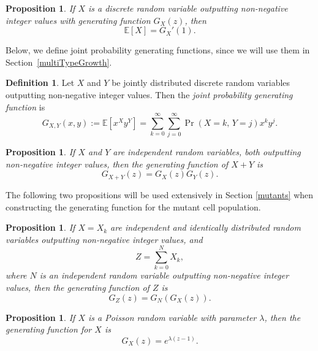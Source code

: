 \documentclass[12pt]{amsart}
\theoremstyle{plain}
\newtheorem{prop}[thm]{Proposition}
\theoremstyle{definition}
\newtheorem{defn}[thm]{Definition}
\theoremstyle{remark}
\theoremstyle{definition}
\begin{document}
\begin{prop}
If $X$ is a discrete random variable outputting non-negative integer values with generating function $G_X(z)$, then
\begin{equation}
\mathbb{E}[X] = G_X'(1).
\end{equation}
\end{prop}

Below, we define joint probability generating functions, since we will use them in Section~\ref{multiTypeGrowth}.

\begin{defn}
Let $X$ and $Y$ be jointly distributed discrete random variables outputting non-negative integer values. Then the \emph{joint probability generating function} is
\begin{equation}
G_{X,Y}(x,y) := \mathbb{E}\left[ x^X y^Y \right] = \sum_{k=0}^\infty \sum_{j=0}^\infty \Pr(X=k, \, Y=j) x^k y^j.
\end{equation}
\end{defn}

\begin{prop}
If $X$ and $Y$ are independent random variables, both outputting non-negative integer values, then the generating function of $X+Y$ is
\begin{equation}
G_{X+Y}(z) = G_X(z) G_Y(z).
\end{equation}
\end{prop}

The following two propositions will be used extensively in Section \ref{mutants} when constructing the generating function for the mutant cell population.

\begin{prop}
If $X=X_k$ are independent and identically distributed random variables outputting non-negative integer values, and
\begin{equation}
Z = \sum_{k=0}^N X_k,
\end{equation}
where $N$ is an independent random variable outputting non-negative integer values, then the generating function of $Z$ is
\begin{equation}
G_Z(z) = G_N(G_X(z)).
\end{equation}
\end{prop}

\begin{prop}
If $X$ is a Poisson random variable with parameter $\lambda$, then the generating function for $X$ is
\begin{equation}
G_X(z) = e^{\lambda(z-1)}.
\end{equation}
\end{prop}
\end{document}

